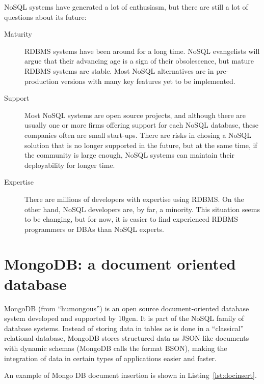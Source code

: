 NoSQL systems have generated a lot of enthusiasm, but there are still a lot of questions about its future:

\begin{description} %

\item[Maturity] %

RDBMS systems have been around for a long time. NoSQL evangelists will argue that their advancing age is a sign of their obsolescence, but mature RDBMS systems are stable. Most NoSQL alternatives are in pre-production versions with many key features yet to be implemented.

\item[Support] %

Most NoSQL systems are open source projects, and although there are usually one or more firms offering support for each NoSQL database, these companies often are small start-ups.
There are risks in chosing a NoSQL solution that is no longer supported in the future, but at the same time, if the community is large enough, NoSQL systems can maintain their deployability for longer time.

\item[Expertise] %

There are millions of developers with expertise using RDBMS. On
the %
other hand, NoSQL developers are, by far, a minority. This situation seems to
be changing, %
but for now, it is easier to find experienced RDBMS programmers or
DBAs %
than NoSQL experts.

\end{description} %

\section{MongoDB: a document oriented database}

MongoDB (from ``humongous'') is an open source document-oriented database system developed and supported by 10gen. It is part of the NoSQL family of database systems. Instead of storing data in tables as is done in a ``classical'' relational database, MongoDB stores structured data as JSON-like documents with dynamic schemas (MongoDB calls the format BSON), making the integration of data in certain types of applications easier and faster. 

An example of Mongo DB document insertion is shown in Listing~\ref{lst:docinsert}.

